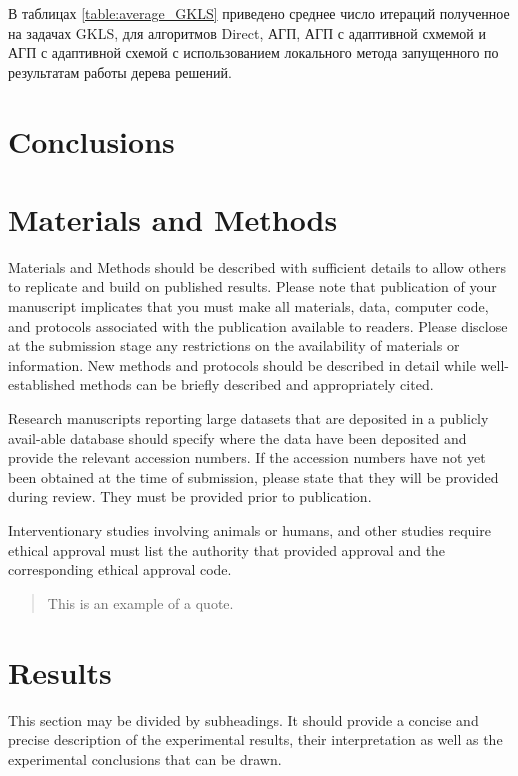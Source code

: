 \documentclass[entropy,article,submit,moreauthors,pdftex]{Definitions/mdpi}
\begin{document}
В таблицах \ref{table:average_GKLS} приведено среднее число итераций полученное на  задачах GKLS, для алгоритмов Direct, АГП, АГП с адаптивной схмемой и АГП с адаптивной схемой с использованием локального метода запущенного по результатам работы дерева решений.



\section{Conclusions}


 
\section{Materials and Methods}

Materials and Methods should be described with sufficient details to allow others to replicate and build on published results. Please note that publication of your manuscript implicates that you must make all materials, data, computer code, and protocols associated with the publication available to readers. Please disclose at the submission stage any restrictions on the availability of materials or information. New methods and protocols should be described in detail while well-established methods can be briefly described and appropriately cited.

Research manuscripts reporting large datasets that are deposited in a publicly avail-able database should specify where the data have been deposited and provide the relevant accession numbers. If the accession numbers have not yet been obtained at the time of submission, please state that they will be provided during review. They must be provided prior to publication.

Interventionary studies involving animals or humans, and other studies require ethical approval must list the authority that provided approval and the corresponding ethical approval code.
\begin{quote}
This is an example of a quote.
\end{quote}

\section{Results}

This section may be divided by subheadings. It should provide a concise and precise description of the experimental results, their interpretation as well as the experimental conclusions that can be drawn.
\end{document}
